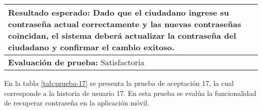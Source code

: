 \begin{longtable}{|p{6.7cm}|p{6.7cm}|}
    \hline
    \multicolumn{2}{|p{13.4cm}|}{\textbf{Resultado esperado:} Dado que el ciudadano ingrese su contraseña actual correctamente y las nuevas contraseñas coincidan, el sistema deberá actualizar la contraseña del ciudadano y confirmar el cambio exitoso.} \\
    \hline
    \multicolumn{2}{|p{13.4cm}|}{\textbf{Evaluación de prueba:} Satisfactoria}                                                                                                                                                                              \\
    \hline
\end{longtable}

En la tabla \ref{tab:prueba-17} se presenta la prueba de aceptación 17, la cual corresponde a la historia de usuario 17.
En esta prueba se evalúa la funcionalidad de recuperar contraseña en la aplicación móvil.

